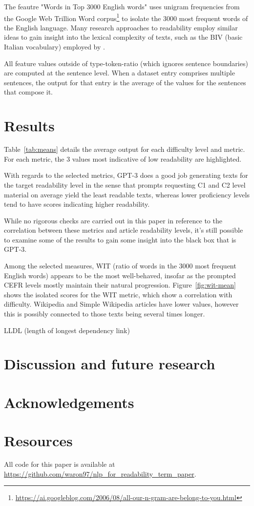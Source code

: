 \documentclass[11pt]{article}
\begin{document}
The feautre "Words in Top 3000 English words" uses unigram frequencies from the Google Web Trillion Word corpus\footnote{\url{https://ai.googleblog.com/2006/08/all-our-n-gram-are-belong-to-you.html}} to isolate the 3000 most frequent words of the English language. Many research approaches to readability employ similar ideas to gain insight into the lexical complexity of texts, such as the BIV (basic Italian vocabulary) employed by \citep{dellorletta-etal-2011-read}.

All feature values outside of type-token-ratio (which ignores sentence boundaries) are computed at the sentence level. When a dataset entry comprises multiple sentences, the output for that entry is the average of the values for the sentences that compose it. 

\section{Results}



Table~\ref{tab:means} details the average output for each difficulty level and metric. For each metric, the 3 values most indicative of low readability are highlighted.

With regards to the selected metrics, GPT-3 does a good job generating texts for the target readability level in the sense that prompts requesting C1 and C2 level material on average yield the least readable texts, whereas lower proficiency levels tend to have scores indicating higher readability.
 
While no rigorous checks are carried out in this paper in reference to the correlation between these metrics and article readability levels, it's still possible to examine some of the results to gain some insight into the black box that is GPT-3.



Among the selected measures, WIT (ratio of words in the 3000 most frequent English words) appears to be the most well-behaved, insofar as the prompted CEFR levels mostly maintain their natural progression. Figure~\ref{fig:wit-mean} shows the isolated scores for the WIT metric, which show a correlation with difficulty. Wikipedia and Simple Wikipedia articles have lower values, however this is possibly connected to those texts being several times longer.

LLDL (length of longest dependency link)


\section{Discussion and future research}

\section*{Acknowledgements}




\appendix
\section*{Resources}

\label{sec:appendix}

All code for this paper is available at \url{https://github.com/waron97/nlp_for_readability_term_paper}.
\end{document}

